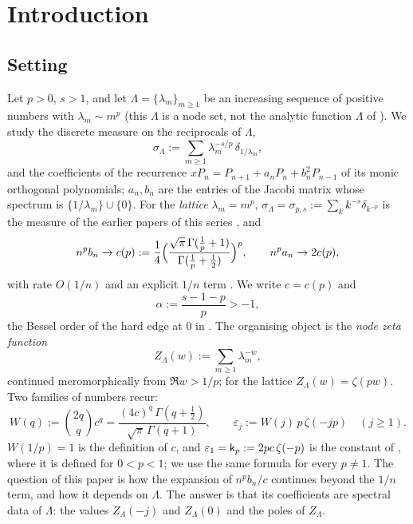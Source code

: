 \section{Introduction}\label{sec:intro}

\subsection{Setting}\label{sec:setting}
Let $p>0$, $s>1$, and let $\Lambda=\{\lambda_m\}_{m\ge1}$ be an increasing sequence of positive numbers with
$\lambda_m\sim m^p$ (this $\Lambda$ is a node set, not the analytic function $\Lambda$ of \cite[Definition~1.1]{PaperII}). We study the discrete measure on the reciprocals of $\Lambda$,
\begin{equation}\label{eq:sigmaL}
  \sigma_\Lambda:=\sum_{m\ge1}\lambda_m^{-s/p}\,\delta_{1/\lambda_m},
\end{equation}
and the coefficients of the recurrence $xP_n=P_{n+1}+a_nP_n+b_n^2P_{n-1}$ of its monic orthogonal polynomials; $a_n,b_n$
are the entries of the Jacobi matrix whose spectrum is $\{1/\lambda_m\}\cup\{0\}$. For the \emph{lattice} $\lambda_m=m^p$,
$\sigma_\Lambda=\sigma_{p,s}:=\sum_kk^{-s}\delta_{k^{-p}}$ is the measure of the earlier papers of this series
\cite{PaperI,PaperII,Paper3}, and
\begin{equation}\label{eq:cp}
  n^pb_n\to c(p):=\frac14\Bigl(\frac{\sqrt\pi\,\Gamma(\frac1p+1)}{\Gamma(\frac1p+\frac12)}\Bigr)^{p},\qquad n^pa_n\to2c(p),
\end{equation}
with rate $O(1/n)$ and an explicit $1/n$ term \cite[Theorems~1.2 and~1.4]{PaperII}. We write $c=c(p)$ and
\begin{equation}\label{eq:alpha-y}
  \alpha:=\frac{s-1-p}{p}>-1,
\end{equation}
the Bessel order of the hard edge at $0$ in \cite{PaperII}. The organising object is the \emph{node zeta function}
\begin{equation}\label{eq:Z}
  Z_\Lambda(w):=\sum_{m\ge1}\lambda_m^{-w},
\end{equation}
continued meromorphically from $\Re w>1/p$; for the lattice $Z_\Lambda(w)=\zeta(pw)$. Two families of numbers recur:
\begin{equation}\label{eq:W}
  W(q):=\binom{2q}{q}c^q=\frac{(4c)^q\,\Gamma(q+\frac12)}{\sqrt\pi\,\Gamma(q+1)},\qquad
  \varepsilon_j:=W(j)\,p\,\zeta(-jp)\quad(j\ge1).
\end{equation}
$W(1/p)=1$ is the definition of $c$, and $\varepsilon_1=\mathsf k_p:=2pc\,\zeta(-p)$ is the constant of \cite[Theorem~1.4(ii)]{PaperII}, where it is defined for $0<p<1$; we use the same formula for every $p\ne1$.
The question of this paper is how the expansion of $n^pb_n/c$ continues beyond the $1/n$ term, and how it depends on
$\Lambda$. The answer is that its coefficients are spectral data of $\Lambda$: the values $Z_\Lambda(-j)$ and $Z_\Lambda(0)$ and the
poles of $Z_\Lambda$.

